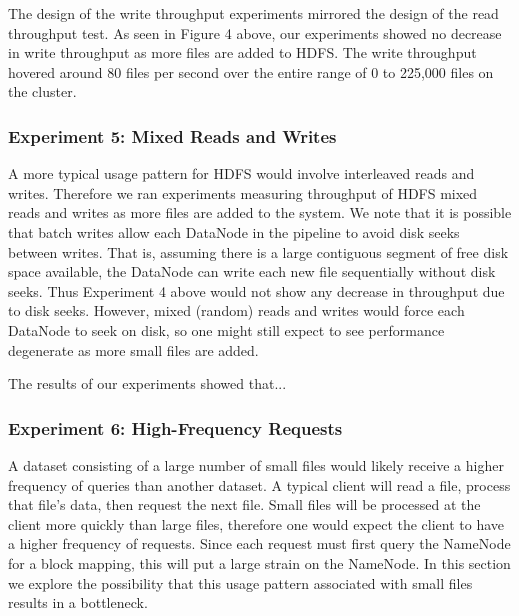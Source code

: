 \documentclass[11pt, a4paper]{article}
\begin{document}
\begin{multicols*}{2}
The design of the write throughput experiments mirrored the design of the read throughput test. As seen in Figure 4 above, our experiments showed no decrease in write throughput as more files are added to HDFS. The write throughput hovered around 80 files per second over the entire range of 0 to 225,000 files on the cluster.

\subsubsection{Experiment 5: Mixed Reads and Writes}\label{ReadWriteThroughput}
A more typical usage pattern for HDFS would involve interleaved reads and writes. Therefore we ran experiments measuring throughput of HDFS mixed reads and writes as more files are added to the system. We note that it is possible that batch writes allow each DataNode in the pipeline to avoid disk seeks between writes. That is, assuming there is a large contiguous segment of free disk space available, the DataNode can write each new file sequentially without disk seeks. Thus Experiment 4 above would not show any decrease in throughput due to disk seeks. However, mixed (random) reads and writes would force each DataNode to seek on disk, so one might still expect to see performance degenerate as more small files are added.

The results of our experiments showed that...

\subsubsection{Experiment 6: High-Frequency Requests}\label{HighFrequencyRequests}
A dataset consisting of a large number of small files would likely receive a higher frequency of queries than another dataset. A typical client will read a file, process that file's data, then request the next file. Small files will be processed at the client more quickly than large files, therefore one would expect the client to have a higher frequency of requests. Since each request must first query the NameNode for a block mapping, this will put a large strain on the NameNode. In this section we explore the possibility that this usage pattern associated with small files results in a bottleneck.



\end{multicols*}
\end{document}
